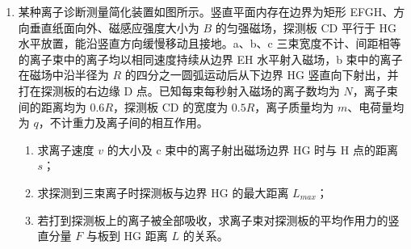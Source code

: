 \documentclass[\gkver]{gaokaozhenti}
\begin{document}
\begin{enumerate}
{（3）$0\leq t\leq0.5\Us$ 电荷量 $q_{1}=\frac{B_{0}L^{2}}{R}=0.25\UC$；$0.5\Us\leq t\leq1.0\Us$ 电荷量 $q_{2}=\frac{B_{1}L^{2}-B_{0}L^{2}}{R}=0.25\UC$；总电荷量 $q=q_{1}+q_{2}=0.5\UC$。
}

\item
某种离子诊断测量简化装置如图所示。竖直平面内存在边界为矩形 EFGH、方向垂直纸面向外、磁感应强度大小为 $B$ 的匀强磁场，探测板 CD 平行于 HG 水平放置，能沿竖直方向缓慢移动且接地。a、b、c 三束宽度不计、间距相等的离子束中的离子均以相同速度持续从边界 EH 水平射入磁场，b 束中的离子在磁场中沿半径为 $R$ 的四分之一圆弧运动后从下边界 HG 竖直向下射出，并打在探测板的右边缘 D 点。已知每束每秒射入磁场的离子数均为 $N$，离子束间的距离均为 $0.6R$，探测板 CD 的宽度为 $0.5R$，离子质量均为 $m$、电荷量均为 $q$，不计重力及离子间的相互作用。
\begin{enumerate}
	\item
	求离子速度 $v$ 的大小及 c 束中的离子射出磁场边界 HG 时与 H 点的距离 $s$；
	\item
	求探测到三束离子时探测板与边界 HG 的最大距离 $L_{max}$；
	\item
	若打到探测板上的离子被全部吸收，求离子束对探测板的平均作用力的竖直分量 $F$ 与板到 HG 距离 $L$ 的关系。
\end{enumerate}
\end{enumerate}
\end{document}
